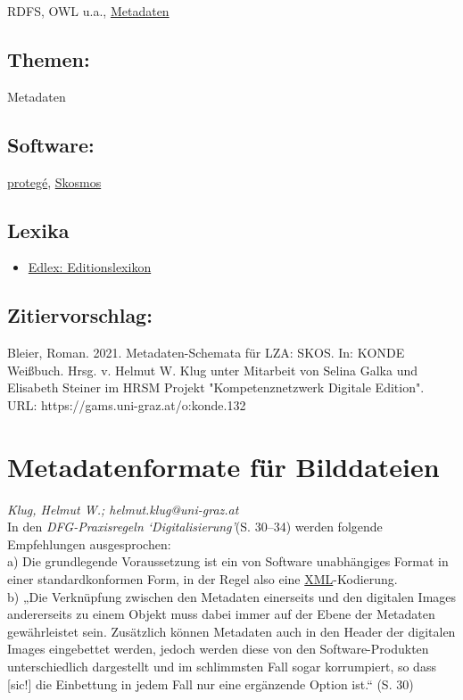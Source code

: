 \documentclass{article}
\begin{document}
{                           RDFS, OWL u.a.}, \href{https://gams.uni-graz.at/o:konde.25}{Metadaten}\subsection*{Themen:}Metadaten\subsection*{Software:}\href{https://protege.stanford.edu/}{protegé}, \href{http://skosmos.org}{Skosmos}\subsection*{Lexika}\begin{itemize}\item \href{https://edlex.de/index.php?title=Simple_Knowledge_Organisation_System_(SKOS)}{Edlex: Editionslexikon}\end{itemize}\subsection*{Zitiervorschlag:}Bleier, Roman. 2021. Metadaten-Schemata für LZA: SKOS. In: KONDE Weißbuch. Hrsg. v. Helmut W. Klug unter Mitarbeit von Selina Galka und Elisabeth Steiner im HRSM Projekt "Kompetenznetzwerk Digitale Edition". URL: https://gams.uni-graz.at/o:konde.132\newpage\section*{Metadatenformate für Bilddateien} \emph{Klug, Helmut W.; helmut.klug@uni-graz.at }\\
        
    In den \emph{DFG-Praxisregeln ‘Digitalisierung’}(S. 30–34) werden folgende Empfehlungen ausgesprochen: \\
            
        a) Die grundlegende Voraussetzung ist ein von Software unabhängiges Format in einer standardkonformen Form, in der Regel also eine \href{http://gams.uni-graz.at/o:konde.215}{XML}-Kodierung. \\
            
        b) „Die Verknüpfung zwischen den Metadaten einerseits und den digitalen Images andererseits zu einem Objekt muss dabei immer auf der Ebene der Metadaten gewährleistet sein. Zusätzlich können Metadaten auch in den Header der digitalen Images eingebettet werden, jedoch werden diese von den Software-Produkten unterschiedlich dargestellt und im schlimmsten Fall sogar korrumpiert, so dass [sic!] die Einbettung in jedem Fall nur eine ergänzende Option ist.“ (S. 30)\\
            
\end{document}
